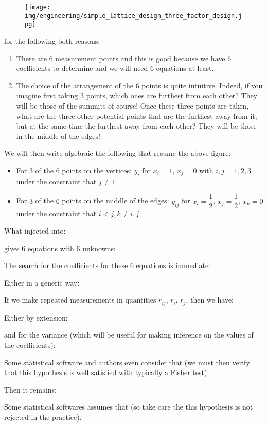	\begin{figure}[H]
		\centering
		\texttt{[image: img/engineering/simple\_lattice\_design\_three\_factor\_design.jpg]}
	\end{figure}
	for the following both reasons:
	\begin{enumerate}
		\item There are $6$ measurement points and this is good because we have $6$ coefficients to determine and we will need $6$ equations at least.

		\item The choice of the arrangement of the $6$ points is quite intuitive. Indeed, if you imagine first taking $3$ points, which ones are furthest from each other? They will be those of the summits of course! Once these three points are taken, what are the three other potential points that are the furthest away from it, but at the same time the furthest away from each other? They will be those in the middle of the edges!
	\end{enumerate}
	We will then write algebraic the following that resume the above figure:
	\begin{itemize}
		\item For $3$ of the $6$ points on the vertices: $y_i$ for $x_i=1$, $x_j=0$ with $i,j=1,2,3$ under the constraint that $j\neq 1$

		\item For $3$ of the $6$ points on the middle of the edges: $y_{ij}$ for $x_i=\dfrac{1}{2}$, $x_j=\dfrac{1}{2}$, $x_k=0$ under the constraint that $i<j,k\neq i,j$
	\end{itemize}
	What injected into:
	
	gives $6$ equations with $6$ unknowns:
	
	The search for the coefficients for these $6$ equations is immediate:
	
	Either in a generic way:
	
 	If we make repeated measurements in quantities $r_{ij}$, $r_i$, $r_j$, then we have:
	
 	Either by extension:
	
 	and for the variance (which will be useful for making inference on the values of the coefficients):
 	
	Some statistical software and authors even consider that (we must then verify that this hypothesis is well satisfied with typically a Fisher test):
	
	Then it remains:
	
	Some statistical softwares assumes that (so take care the this hypothesis is not rejected in the practice).
	

